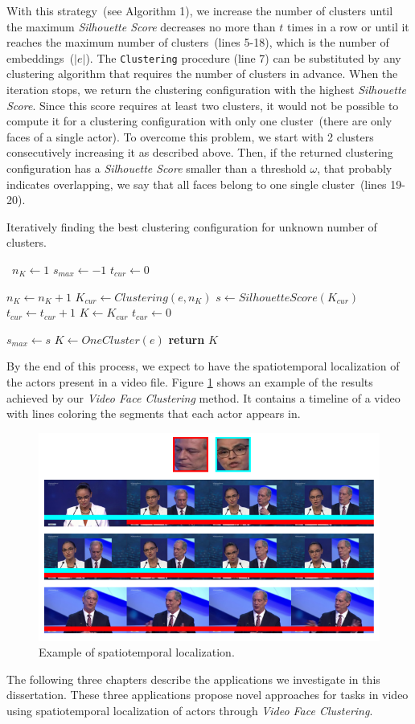 With this strategy~(see Algorithm 1), we increase the number of clusters until the maximum \emph{Silhouette Score} decreases no more than $t$ times in a row or until it reaches the maximum number of clusters~(lines 5-18), which is the number of embeddings~($|e|$).
The \texttt{Clustering} procedure (line 7)
can be substituted by any clustering algorithm that requires the number of clusters in advance.
When the iteration stops, we return the clustering configuration with the highest \emph{Silhouette Score}.
Since this score requires at least two clusters, it would not be possible to compute it for a clustering configuration with only one cluster~(there are only faces of a single actor).
To overcome this problem, we start with 2 clusters consecutively increasing it as described above. Then, if the returned clustering configuration has a \emph{Silhouette Score} smaller than a threshold $\omega$, that probably indicates overlapping, we say that all faces belong to one single cluster~(lines 19-20). 

\begin{algorithm}
\small
\caption{Iteratively finding the best clustering configuration for unknown number of clusters.}\label{clustering_alg}
\begin{algorithmic}[1]
\
\State $n_K\gets 1$
\State $s_{max}\gets -1$
\State $t_{cur}\gets 0$ 

    \State $n_K\gets n_K+1$
    \State $K_{cur}\gets Clustering(e, n_K)$
    \State $s \gets SilhouetteScore(K_{cur})$
        \State $t_{cur}\gets t_{cur}+1$
    \Else
        \State $K\gets K_{cur}$
        \State $t_{cur}\gets 0$
        
            \State $s_{max} \gets s$
        \EndIf
    \EndIf
\EndWhile
{}
    \State $K\gets OneCluster(e)$
\EndIf
\State \textbf{return} $K$
\EndProcedure
\end{algorithmic}
\end{algorithm}


By the end of this process, we expect to have the spatiotemporal localization of the actors present in a video file.
Figure \ref{fig:timeline} shows an example of the results achieved by our \emph{Video Face Clustering} method. It contains a timeline of a video with lines coloring the segments that each actor appears in.

\begin{figure}[!ht]
    \centering
    \includegraphics[width=0.65\linewidth]{img/face_clustering/example_localization.png}
    \caption{Example of spatiotemporal localization.}
    \label{fig:timeline}
\end{figure}

The following three chapters describe the applications we investigate in this dissertation. 
These three applications propose novel approaches for tasks in video using spatiotemporal localization of actors through \emph{Video Face Clustering}.

